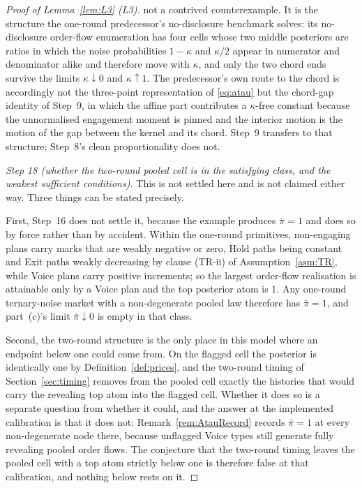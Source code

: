 \documentclass[11pt]{article}
\begin{document}
\begin{proof}[Proof of Lemma~\ref{lem:L3} (L3)]
not a contrived counterexample. It is the structure the one-round predecessor's no-disclosure
benchmark solves: its no-disclosure
order-flow enumeration has four cells whose two middle posteriors are ratios in which the noise
probabilities $1-\kappa$ and $\kappa/2$ appear in numerator and denominator alike and therefore move
with $\kappa$, and only the two chord ends survive the limits $\kappa \downarrow 0$ and
$\kappa \uparrow 1$. The predecessor's own route to the chord is accordingly not the three-point
representation of \eqref{eq:atau} but the chord-gap identity of Step~9, in which the affine part
contributes a $\kappa$-free constant because the unnormalised engagement moment is pinned and the
interior motion is the motion of the gap between the kernel and its chord. Step~9 transfers to that
structure; Step~8's clean proportionality does not.

\emph{Step 18 (whether the two-round pooled cell is in the satisfying class, and the weakest
sufficient conditions).} This is not settled here and is not claimed either way. Three things can be
stated precisely.

First, Step~16 does not settle it, because the example produces $\bar\pi = 1$ and does so by force
rather than by accident. Within the one-round primitives, non-engaging plans carry marks that are
weakly negative or zero, Hold paths being constant and Exit paths weakly decreasing by clause (TR-ii)
of Assumption~\ref{asm:TR}, while Voice plans carry positive increments; so the largest order-flow
realisation is attainable only by a Voice plan and the top posterior atom is $1$. Any one-round
ternary-noise market with a non-degenerate pooled law therefore has $\bar\pi = 1$, and part~(c)'s
limit $\bar\pi \downarrow 0$ is empty in that class.

Second, the two-round structure is the only place in this model where an endpoint below one could
come from. On the flagged cell the posterior is identically one by Definition~\ref{def:prices}, and
the two-round timing of Section~\ref{sec:timing} removes from the pooled cell exactly the histories
that would carry the revealing top atom into the flagged cell. Whether it does so is a separate
question from whether it could, and the answer at the implemented calibration is that it does not:
Remark~\ref{rem:AtauRecord} records $\bar\pi = 1$ at every non-degenerate node there, because
unflagged Voice types still generate fully revealing pooled order flows. The conjecture that the
two-round timing leaves the pooled cell with a top atom strictly below one is therefore false at that
calibration, and nothing below rests on it.


\end{proof}
\end{document}

